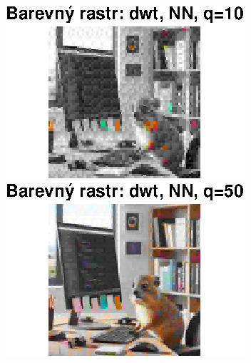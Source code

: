 \begin{figure}[H]
    \centering
    \begin{minipage}[b]{0.3\textwidth}
        \centering
        \includegraphics[width=\textwidth]{images/barevny_dwt_NN_q10.eps}
    \end{minipage}
    \hfill
    \begin{minipage}[b]{0.3\textwidth}
        \centering
        \includegraphics[width=\textwidth]{images/barevny_dwt_NN_q50.eps}
    \end{minipage}
    \hfill
    \begin{minipage}[b]{0.3\textwidth}
        \centering

\end{minipage}
\end{figure}
